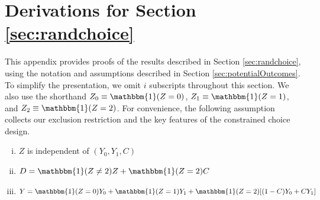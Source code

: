 




\newpage



\section{Derivations for Section \ref{sec:randchoice}}
\label{append:randchoice}


This appendix provides proofs of the results described in Section \ref{sec:randchoice}, using the notation and assumptions described in Section \ref{sec:potentialOutcomes}. 
To simplify the presentation, we omit $i$ subscripts throughout this section.
We also use the shorthand $Z_0 \equiv \mathbbm{1}(Z=0)$, $Z_1 \equiv \mathbbm{1}(Z=1)$, and $Z_2 \equiv\mathbbm{1}(Z=2)$.
For convenience, the following assumption collects our exclusion restriction and the key features of the constrained choice design.

\begin{assumption}\mbox{}
\label{assump:randchoice}
   \begin{enumerate}[(i)]
   \item $Z$ is independent of $(Y_{0}, Y_{1}, C)$
   \item $D = \mathbbm{1}(Z \neq 2)Z + \mathbbm{1}(Z = 2)C$
   \item $Y = \mathbbm{1}(Z = 0) Y_{0} + \mathbbm{1}(Z = 1) Y_{1} + \mathbbm{1}(Z = 2) [ (1 - C) Y_{0} + C Y_{1}]$
   \end{enumerate}
\end{assumption}


